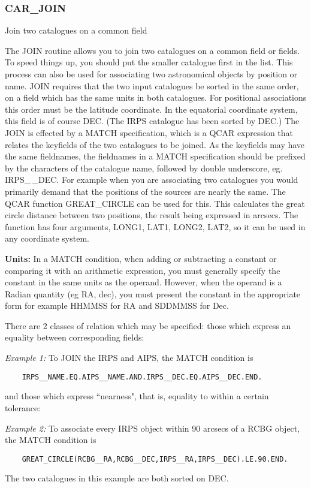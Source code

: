 \subsubsection{CAR\_JOIN}

Join two catalogues on a common field

The JOIN routine allows you to join two catalogues on a common field
or fields.
To speed things up, you should put the smaller catalogue first in the list.
This process can also be used for associating two astronomical objects by 
position or name.
JOIN requires that the two input catalogues be sorted in the same order,
on a field which has the same units in both catalogues.  
For positional associations this order must be the latitude coordinate.
In the equatorial coordinate system, this field is of course DEC.
(The IRPS catalogue has been sorted by DEC.)
The JOIN is effected by a MATCH specification, which is a QCAR expression 
that relates the keyfields of the two catalogues to be joined.
As the keyfields may have the same fieldnames, the fieldnames in a MATCH
specification should be prefixed by the characters of the catalogue
name, followed by double underscore, eg. IRPS\_\,\_DEC.
For example when you are associating two catalogues you would primarily
demand that the positions of the sources are nearly the same.  
The QCAR function GREAT\_CIRCLE can be used for this.
This calculates the great circle distance between two positions, the result 
being expressed in arcsecs.    
The function has four arguments, LONG1, LAT1, LONG2, LAT2, so it can be 
used in any coordinate system.

{\bf Units:} In a MATCH condition, when adding or subtracting a constant or
comparing it with an arithmetic expression, you must generally specify the
constant in the same units as the operand.
However, when the operand is a Radian quantity (eg RA, dec), you must present 
the constant in the appropriate form for example HHMMSS for RA
and SDDMMSS for Dec.

There are 2 classes of relation which may be specified: those which express an
equality between corresponding fields:

{\em Example 1:}  To JOIN the IRPS and AIPS, the MATCH condition is
\begin{verbatim}
    IRPS__NAME.EQ.AIPS__NAME.AND.IRPS__DEC.EQ.AIPS__DEC.END.
\end{verbatim}
and those which express ``nearness", that is, equality to within a certain
tolerance:

{\em Example 2:} To associate every IRPS object within 90 arcsecs of
a RCBG object, the MATCH condition is
\begin{verbatim}
    GREAT_CIRCLE(RCBG__RA,RCBG__DEC,IRPS__RA,IRPS__DEC).LE.90.END.
\end{verbatim}
The two catalogues in this example are both sorted on DEC.  

